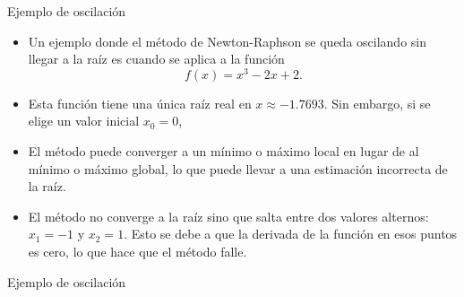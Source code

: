 \documentclass{beamer}
\begin{document}
\begin{frame}{Ejemplo de oscilación} 

\begin{itemize}

\item Un ejemplo donde el método de Newton-Raphson se queda oscilando sin llegar a la raíz es cuando se aplica a la función \[f(x) = x^3 - 2x + 2.\] 

\item Esta función tiene una única raíz real en $x \approx -1.7693$. Sin embargo, si se elige un valor inicial $x_0 = 0$, 

\item  El método puede converger a un mínimo o máximo local en lugar de al mínimo o máximo global, lo que puede llevar a una estimación incorrecta de la raíz.

\item El método no converge a la raíz sino que salta entre dos valores alternos: $x_1 = -1$ y $x_2 = 1$. Esto se debe a que la derivada de la función en esos puntos es cero, lo que hace que el método falle. 
 
 \end{itemize} 

 \end{frame}





\begin{frame}{Ejemplo de oscilación} 
   \begin{center}
  \end{center}
\end{frame}
\end{document}
